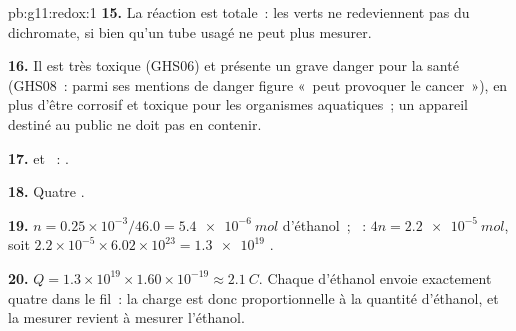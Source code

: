\begin{solution}{pb:g11:redox:1}
\textbf{15.} La réaction est totale~: les   verts ne
redeviennent pas du dichromate, si bien qu'un tube usagé ne peut plus
mesurer.

\textbf{16.} Il est très toxique (GHS06) et présente un grave danger pour
la santé (GHS08~: parmi ses mentions de danger figure «~peut provoquer le
cancer~»), en plus d'être corrosif et toxique pour les organismes
aquatiques~; un appareil destiné au public ne doit pas en contenir.

\textbf{17.}  et
~:
.

\textbf{18.} Quatre .

\textbf{19.} $n = 0.25\times 10^{-3}/46.0 = \qty{5.4e-6}{mol}$
d'éthanol~; ~: $4n = \qty{2.2e-5}{mol}$, soit
$2.2\times 10^{-5}\times 6.02\times 10^{23} = \num{1.3e19}$ .

\textbf{20.} $Q = 1.3\times 10^{19}\times 1.60\times 10^{-19} \approx
\qty{2.1}{C}$. Chaque  d'éthanol envoie exactement quatre
 dans le fil~: la charge est donc proportionnelle à la quantité
d'éthanol, et la mesurer revient à mesurer l'éthanol.
\end{solution}

